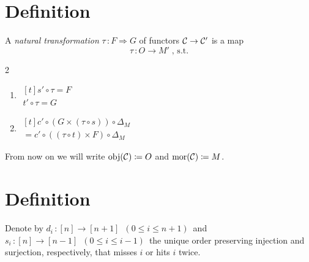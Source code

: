     \section{Definition}
        A \emph{natural transformation} $\tau \,\colon F \Rightarrow G$ of functors $\mathcal{C} \to \mathcal{C}'$ is a map
        \begin{equation*}
            \tau \,\colon O \to M' \; \text{, s.t.}
        \end{equation*}
        \begin{multicols}{2}
            \begin{enumerate}[label=\arabic*)]\centering
                \item
                    $\begin{aligned}[t]
                        s' \circ \tau = F \\
	                    t' \circ \tau = G
                    \end{aligned}$
                \item 
                    $\begin{aligned}[t]
                        c' \circ (G \times (\tau \circ s)) \circ \Delta_M \\
                        = c' \circ ((\tau \circ t) \times F) \circ \Delta_M
                    \end{aligned}$
            \end{enumerate}
        \end{multicols}
        From now on we will write $\operatorname{obj}(\mathcal{C}) \coloneq O$ and $\operatorname{mor}(\mathcal{C}) \coloneq M$.
    \section{Definition}
        Denote by $d_i \,\colon [n] \to [n + 1] \enspace (0 \leq i \leq n + 1) \,$ and $s_i \,\colon [n] \to [n - 1] \enspace (0 \leq i \leq i - 1) \,$ the unique order preserving injection and surjection, respectively, that misses $i$ or hits $i$ twice.
